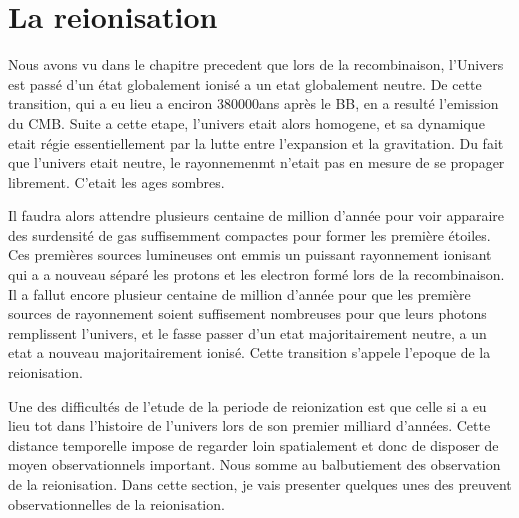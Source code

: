 \chapter{La reionisation} 
%
%
%
%


Nous avons vu dans le chapitre precedent que lors de la recombinaison, l'Univers est passé d'un état globalement ionisé a un etat globalement neutre.
De cette transition, qui a eu lieu a enciron 380000ans après le BB, en a resulté l'emission du CMB.
Suite a cette etape, l'univers etait alors homogene, et sa dynamique etait régie essentiellement par la lutte entre l'expansion et la gravitation.
Du fait que l'univers etait neutre, le rayonnemenmt n'etait pas en mesure de se propager librement.
C'etait les ages sombres.

Il faudra alors attendre plusieurs centaine de million d'année pour voir apparaire des surdensité de gas suffisemment compactes pour former les première étoiles.
Ces premières sources lumineuses ont emmis un puissant rayonnement ionisant qui a a nouveau séparé les protons et les electron formé lors de la recombinaison.
Il a fallut encore plusieur centaine de million d'année pour que les première sources de rayonnement soient suffisement nombreuses pour que leurs photons remplissent l'univers, et le fasse passer d'un etat majoritairement neutre, a un etat a nouveau majoritairement ionisé. 
Cette transition s'appele l'epoque de la reionisation.

Une des difficultés de l'etude de la periode de reionization est que celle si a eu lieu tot dans l'histoire de l'univers lors de son premier milliard d'années.
Cette distance temporelle impose de regarder loin spatialement et donc de disposer de moyen observationnels important.
Nous somme au balbutiement des observation de la reionisation.
Dans cette section, je vais presenter quelques unes des preuvent observationnelles de la reionisation. 

